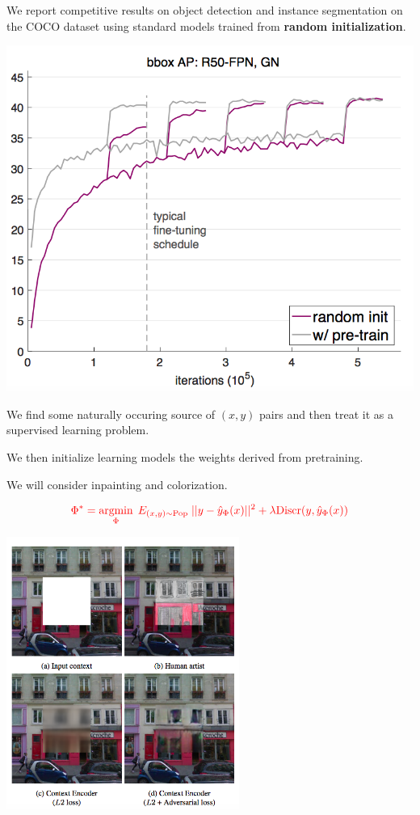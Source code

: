 {

We report competitive results on object detection and instance segmentation on the COCO dataset using standard
models trained from {\bf random initialization}.



\centerline{\includegraphics[width=6.0 in]{../images/RethinkingPre}}


We find some naturally occuring source of $(x,y)$ pairs and then treat it as a supervised learning problem.

\vfill
We then initialize learning models the weights derived from pretraining.

\vfill
We will consider inpainting and colorization.


$${\color{red} \Phi^* = \operatorname*{argmin}_{\Phi}\; E_{(x,y) \sim \mathrm{Pop}}\;||y - \hat{y}_\Phi(x)||^2 + \lambda \mathrm{Discr}(y,\hat{y}_\Phi(x))}$$

\centerline{\includegraphics[width = 3in]{../images/LearnRepInpa}}

}
